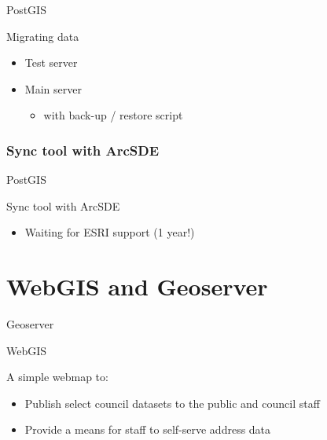 \begin{frame}{PostGIS}
	\begin{block}{Migrating data}
		\begin{itemize}
			\item Test server
			\item Main server
			\begin{itemize}
				\item with back-up / restore script
			\end{itemize}
		\end{itemize}
	\end{block}	
\end{frame}

\subsubsection{Sync tool with ArcSDE}

\begin{frame}{PostGIS}
	\begin{block}{Sync tool with ArcSDE}
		\begin{itemize}
			\item Waiting for ESRI support (1 year!)
		\end{itemize}
	\end{block}	
\end{frame}

\section{WebGIS and Geoserver}
\begin{frame}{Geoserver}
\end{frame}

\begin{frame}{WebGIS}
	\begin{block}{A simple webmap to:}
		\begin{itemize}
			\item Publish select council datasets to the public and council staff
			\item Provide a means for staff to self-serve address data 
		\end{itemize}
	\end{block}	
\end{frame}



